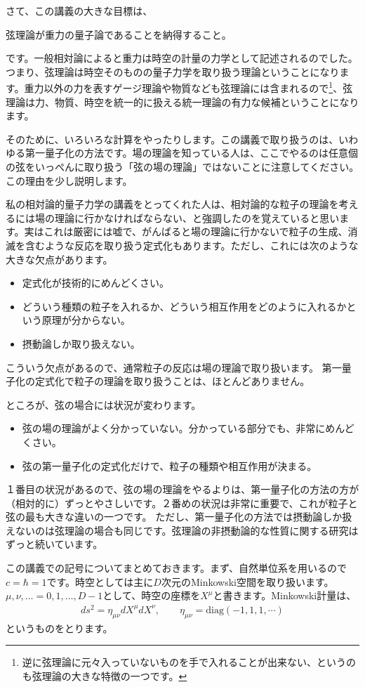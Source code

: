 \documentclass[report,paper=a4, fontsize=12pt, line_length=16cm, number_of_lines=34,dvipdfmx]{jlreq}
\newenvironment{important}{\begin{tcolorbox}[
  colback = white,
  colframe = red!35,
  boxrule = 2mm,
  fonttitle = \bfseries,
  after = \noindent] }{\end{tcolorbox}}
\numberwithin{equation}{chapter}
\numberwithin{equation}{section}
\begin{document}
さて、この講義の大きな目標は、
\begin{important}
  弦理論が重力の量子論であることを納得すること。
\end{important}
です。一般相対論によると重力は時空の計量の力学として記述されるのでした。つまり、弦理論は時空そのものの量子力学を取り扱う理論ということになります。重力以外の力を表すゲージ理論や物質なども弦理論には含まれるので\footnote{逆に弦理論に元々入っていないものを手で入れることが出来ない、というのも弦理論の大きな特徴の一つです。}、弦理論は力、物質、時空を統一的に扱える統一理論の有力な候補ということになります。

そのために、いろいろな計算をやったりします。この講義で取り扱うのは、いわゆる第一量子化の方法です。場の理論を知っている人は、ここでやるのは任意個の弦をいっぺんに取り扱う「弦の場の理論」ではないことに注意してください。この理由を少し説明します。

私の相対論的量子力学の講義をとってくれた人は、相対論的な粒子の理論を考えるには場の理論に行かなければならない、と強調したのを覚えていると思います。実はこれは厳密には嘘で、がんばると場の理論に行かないで粒子の生成、消滅を含むような反応を取り扱う定式化もあります。ただし、これには次のような大きな欠点があります。
\begin{itemize}
  \item 定式化が技術的にめんどくさい。
  \item どういう種類の粒子を入れるか、どういう相互作用をどのように入れるかという原理が分からない。
  \item 摂動論しか取り扱えない。
\end{itemize}
こういう欠点があるので、通常粒子の反応は場の理論で取り扱います。
第一量子化の定式化で粒子の理論を取り扱うことは、ほとんどありません。

ところが、弦の場合には状況が変わります。
\begin{itemize}
  \item 弦の場の理論がよく分かっていない。分かっている部分でも、非常にめんどくさい。
  \item 弦の第一量子化の定式化だけで、粒子の種類や相互作用が決まる。
\end{itemize}
１番目の状況があるので、弦の場の理論をやるよりは、第一量子化の方法の方が（相対的に）ずっとやさしいです。２番めの状況は非常に重要で、これが粒子と弦の最も大きな違いの一つです。
ただし、第一量子化の方法では摂動論しか扱えないのは弦理論の場合も同じです。弦理論の非摂動論的な性質に関する研究はずっと続いています。

この講義での記号についてまとめておきます。まず、自然単位系を用いるので$c=\hbar=1$です。時空としては主に$D$次元のMinkowski空間を取り扱います。$\mu,\nu,\dots=0,1,\dots,D-1$として、時空の座標を$X^{\mu}$と書きます。Minkowski計量は、
\begin{align}
  ds^2=\eta_{\mu\nu}dX^{\mu}dX^{\nu},\qquad
  \eta_{\mu\nu}=\mathrm{diag}(-1,1,1,\cdots)
\end{align}
というものをとります。
\end{document}
